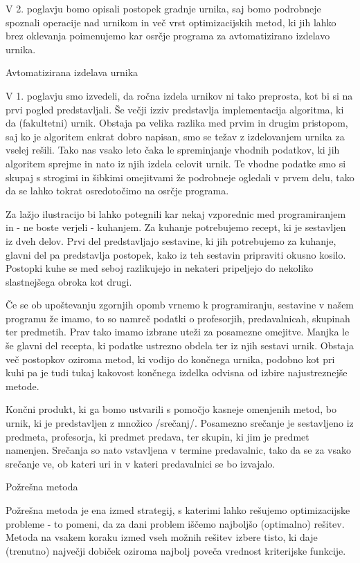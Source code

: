 \documentclass[a4paper,10pt]{article}
\begin{document}
V 2. poglavju bomo opisali postopek gradnje urnika, saj bomo podrobneje spoznali
operacije nad urnikom in več vrst optimizacijskih metod, ki jih lahko brez oklevanja
poimenujemo kar osrčje programa za avtomatizirano izdelavo urnika.

Avtomatizirana izdelava urnika %

V 1. poglavju smo izvedeli, da ročna izdela urnikov ni tako preprosta, kot bi si
na prvi pogled predstavljali. Še večji izziv predstavlja implementacija algoritma, ki da
(fakultetni) urnik. Obstaja pa velika razlika med prvim in drugim pristopom, saj ko je
algoritem enkrat dobro napisan, smo se težav z izdelovanjem urnika za vselej rešili.
Tako nas vsako leto čaka le spreminjanje vhodnih podatkov, ki jih algoritem sprejme in
nato iz njih izdela celovit urnik. Te vhodne podatke smo si skupaj s strogimi in šibkimi
omejitvami že podrobneje ogledali v prvem delu, tako da se lahko tokrat osredotočimo na
osrčje programa.

Za lažjo ilustracijo bi lahko potegnili kar nekaj vzporednic med programiranjem in - ne
boste verjeli - kuhanjem. Za kuhanje potrebujemo recept, ki je sestavljen iz dveh delov.
Prvi del predstavljajo sestavine, ki jih potrebujemo za kuhanje, glavni del pa predstavlja
postopek, kako iz teh sestavin pripraviti okusno kosilo. Postopki kuhe se med seboj
razlikujejo in nekateri pripeljejo do nekoliko slastnejšega obroka kot drugi.

Če se ob upoštevanju zgornjih opomb vrnemo k programiranju, sestavine v našem programu že
imamo, to so namreč podatki o profesorjih, predavalnicah, skupinah ter predmetih. Prav tako
imamo izbrane uteži za posamezne omejitve. Manjka le še glavni del recepta, ki podatke
ustrezno obdela ter iz njih sestavi urnik. Obstaja več postopkov oziroma metod, ki vodijo
do končnega urnika, podobno kot pri kuhi pa je tudi tukaj kakovost končnega izdelka odvisna
od izbire najustreznejše metode.

Končni produkt, ki ga bomo ustvarili s pomočjo kasneje omenjenih metod, bo urnik, ki je
predstavljen z množico /srečanj/. Posamezno srečanje je sestavljeno iz predmeta,
profesorja, ki predmet predava, ter skupin, ki jim je predmet namenjen. Srečanja so nato
vstavljena v termine predavalnic, tako da se za vsako srečanje ve, ob kateri uri in v
kateri predavalnici se bo izvajalo.

Požrešna metoda %

Požrešna metoda je ena izmed strategij, s katerimi lahko rešujemo optimizacijske probleme -
to pomeni, da za dani problem iščemo najboljšo (optimalno) rešitev. Metoda na vsakem koraku
izmed vseh možnih rešitev izbere  tisto, ki daje (trenutno) največji dobiček oziroma najbolj
poveča vrednost kriterijske funkcije.
\end{document}

